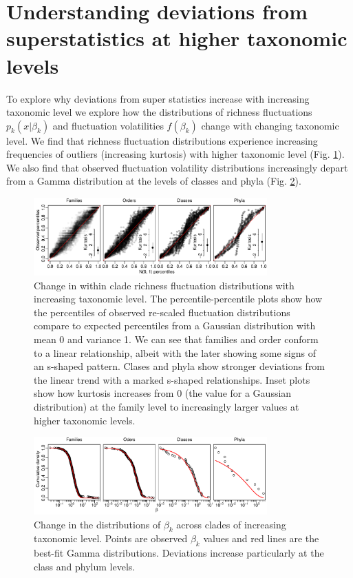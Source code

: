\documentclass[12pt]{article}
\begin{document}
\section{Understanding deviations from superstatistics at higher
  taxonomic levels}
\label{sec:suppSstatTaxLevels}

To explore why deviations from super statistics increase with
increasing taxonomic level we explore how the distributions of
richness fluctuations $p_k(x | \beta_k)$ and fluctuation volatilities
$f(\beta_k)$ change with changing taxonomic level. We find that
richness fluctuation distributions experience increasing frequencies
of outliers (increasing kurtosis) with higher taxonomic level
(Fig. \ref{figSupp:pkx_allTaxa}). We also find that observed
fluctuation volatility distributions increasingly depart from a Gamma
distribution at the levels of classes and phyla
(Fig. \ref{figSupp:fbeta_allTaxa}).

\begin{figure}[!hp]
  \centering
  \includegraphics[width=0.8\textwidth]{../../figSupp_pkx_allTaxa.pdf}
  \caption{Change in within clade richness fluctuation distributions
    with increasing taxonomic level. The percentile-percentile plots
    show how the percentiles of observed re-scaled fluctuation
    distributions compare to expected percentiles from a Gaussian
    distribution with mean 0 and variance 1. We can see that families
    and order conform to a linear relationship, albeit with the later
    showing some signs of an s-shaped pattern. Clases and phyla show
    stronger deviations from the linear trend with a marked s-shaped
    relationships. Inset plots show how kurtosis increases from 0 (the
    value for a Gaussian distribution) at the family level to
    increasingly larger values at higher taxonomic levels.}
  \label{figSupp:pkx_allTaxa}
\end{figure}

\begin{figure}[!hp]
  \centering
  \includegraphics[width=0.8\textwidth]{../../figSupp_fbeta_allTaxa.pdf}
  \caption{Change in the distributions of $\beta_k$ across clades of
    increasing taxonomic level. Points are observed $\beta_k$ values
    and red lines are the best-fit Gamma distributions. Deviations
    increase particularly at the class and phylum levels.}
  \label{figSupp:fbeta_allTaxa}
\end{figure}
\end{document}
